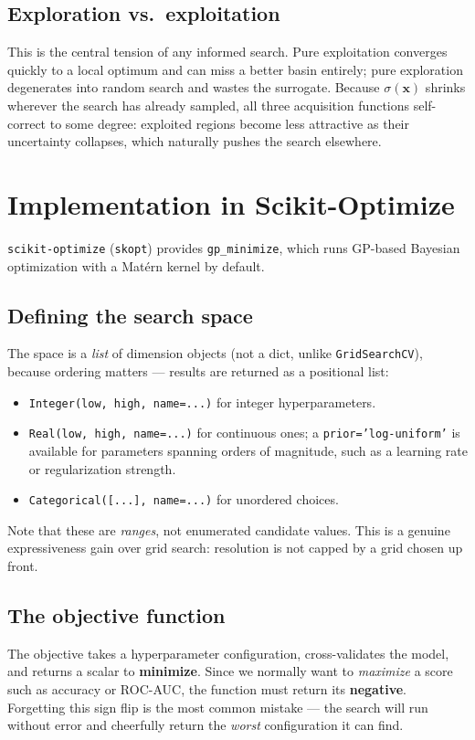 \documentclass[conference]{IEEEtran}
\begin{document}
\subsection*{Exploration vs.\ exploitation}
This is the central tension of any informed search. Pure exploitation converges quickly to a local optimum and can miss a better basin entirely; pure exploration degenerates into random search and wastes the surrogate. Because $\sigma(\mathbf{x})$ shrinks wherever the search has already sampled, all three acquisition functions self-correct to some degree: exploited regions become less attractive as their uncertainty collapses, which naturally pushes the search elsewhere.

\section*{Implementation in Scikit-Optimize}
\texttt{scikit-optimize} (\texttt{skopt}) provides \texttt{gp\_minimize}, which runs GP-based Bayesian optimization with a Mat\'ern kernel by default.

\subsection*{Defining the search space}
The space is a \textit{list} of dimension objects (not a dict, unlike \texttt{GridSearchCV}), because ordering matters --- results are returned as a positional list:
\begin{itemize}
    \item \texttt{Integer(low, high, name=...)} for integer hyperparameters.
    \item \texttt{Real(low, high, name=...)} for continuous ones; a \texttt{prior='log-uniform'} is available for parameters spanning orders of magnitude, such as a learning rate or regularization strength.
    \item \texttt{Categorical([...], name=...)} for unordered choices.
\end{itemize}
Note that these are \textit{ranges}, not enumerated candidate values. This is a genuine expressiveness gain over grid search: resolution is not capped by a grid chosen up front.

\subsection*{The objective function}
The objective takes a hyperparameter configuration, cross-validates the model, and returns a scalar to \textbf{minimize}. Since we normally want to \textit{maximize} a score such as accuracy or ROC-AUC, the function must return its \textbf{negative}. Forgetting this sign flip is the most common mistake --- the search will run without error and cheerfully return the \textit{worst} configuration it can find.
\end{document}
